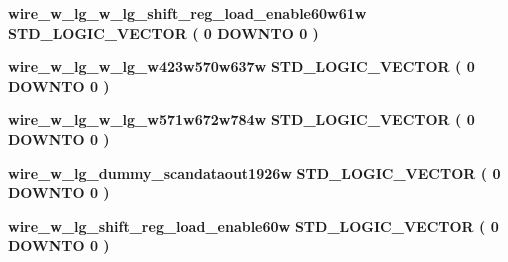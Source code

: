 \begin{DoxyCompactItemize}
\item 
{\bf wire\+\_\+w\+\_\+lg\+\_\+w\+\_\+lg\+\_\+shift\+\_\+reg\+\_\+load\+\_\+enable60w61w} {\bfseries \textcolor{comment}{S\+T\+D\+\_\+\+L\+O\+G\+I\+C\+\_\+\+V\+E\+C\+T\+OR}\textcolor{vhdlchar}{ }\textcolor{vhdlchar}{(}\textcolor{vhdlchar}{ }\textcolor{vhdlchar}{ } \textcolor{vhdldigit}{0} \textcolor{vhdlchar}{ }\textcolor{keywordflow}{D\+O\+W\+N\+TO}\textcolor{vhdlchar}{ }\textcolor{vhdlchar}{ } \textcolor{vhdldigit}{0} \textcolor{vhdlchar}{ }\textcolor{vhdlchar}{)}\textcolor{vhdlchar}{ }} 
\item 
{\bf wire\+\_\+w\+\_\+lg\+\_\+w\+\_\+lg\+\_\+w423w570w637w} {\bfseries \textcolor{comment}{S\+T\+D\+\_\+\+L\+O\+G\+I\+C\+\_\+\+V\+E\+C\+T\+OR}\textcolor{vhdlchar}{ }\textcolor{vhdlchar}{(}\textcolor{vhdlchar}{ }\textcolor{vhdlchar}{ } \textcolor{vhdldigit}{0} \textcolor{vhdlchar}{ }\textcolor{keywordflow}{D\+O\+W\+N\+TO}\textcolor{vhdlchar}{ }\textcolor{vhdlchar}{ } \textcolor{vhdldigit}{0} \textcolor{vhdlchar}{ }\textcolor{vhdlchar}{)}\textcolor{vhdlchar}{ }} 
\item 
{\bf wire\+\_\+w\+\_\+lg\+\_\+w\+\_\+lg\+\_\+w571w672w784w} {\bfseries \textcolor{comment}{S\+T\+D\+\_\+\+L\+O\+G\+I\+C\+\_\+\+V\+E\+C\+T\+OR}\textcolor{vhdlchar}{ }\textcolor{vhdlchar}{(}\textcolor{vhdlchar}{ }\textcolor{vhdlchar}{ } \textcolor{vhdldigit}{0} \textcolor{vhdlchar}{ }\textcolor{keywordflow}{D\+O\+W\+N\+TO}\textcolor{vhdlchar}{ }\textcolor{vhdlchar}{ } \textcolor{vhdldigit}{0} \textcolor{vhdlchar}{ }\textcolor{vhdlchar}{)}\textcolor{vhdlchar}{ }} 
\item 
{\bf wire\+\_\+w\+\_\+lg\+\_\+dummy\+\_\+scandataout1926w} {\bfseries \textcolor{comment}{S\+T\+D\+\_\+\+L\+O\+G\+I\+C\+\_\+\+V\+E\+C\+T\+OR}\textcolor{vhdlchar}{ }\textcolor{vhdlchar}{(}\textcolor{vhdlchar}{ }\textcolor{vhdlchar}{ } \textcolor{vhdldigit}{0} \textcolor{vhdlchar}{ }\textcolor{keywordflow}{D\+O\+W\+N\+TO}\textcolor{vhdlchar}{ }\textcolor{vhdlchar}{ } \textcolor{vhdldigit}{0} \textcolor{vhdlchar}{ }\textcolor{vhdlchar}{)}\textcolor{vhdlchar}{ }} 
\item 
{\bf wire\+\_\+w\+\_\+lg\+\_\+shift\+\_\+reg\+\_\+load\+\_\+enable60w} {\bfseries \textcolor{comment}{S\+T\+D\+\_\+\+L\+O\+G\+I\+C\+\_\+\+V\+E\+C\+T\+OR}\textcolor{vhdlchar}{ }\textcolor{vhdlchar}{(}\textcolor{vhdlchar}{ }\textcolor{vhdlchar}{ } \textcolor{vhdldigit}{0} \textcolor{vhdlchar}{ }\textcolor{keywordflow}{D\+O\+W\+N\+TO}\textcolor{vhdlchar}{ }\textcolor{vhdlchar}{ } \textcolor{vhdldigit}{0} \textcolor{vhdlchar}{ }\textcolor{vhdlchar}{)}\textcolor{vhdlchar}{ }} 

\end{DoxyCompactItemize}
